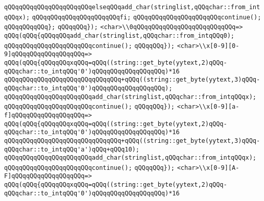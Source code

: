 \verb|qQQqqQQqqQQqqQQqqQQqqQQqelseqQQqadd_char(stringlist,qQQqchar::from_intqQQqx);|\newline
\verb|qQQqqQQqqQQqqQQqqQQqqQQqfi;|\newline
\verb|qQQqqQQqqQQqqQQqqQQqqQQqcontinue();|\newline
\verb|qQQqqQQqqQQq};|\newline
\verb|qQQqqQQq});|\newline
\newline
\verb|<char>\\0qQQqqQQqqQQqqQQqqQQqqQQqqQQq=>|\newline
\verb|qQQq(qQQq{qQQqqQQqadd_char(stringlist,qQQqchar::from_intqQQq0);|\newline
\verb|qQQqqQQqqQQqqQQqqQQqqQQqcontinue();|\newline
\verb|qQQqqQQq});|\newline
\newline
\verb|<char>\\x[0-9][0-9]qQQqqQQqqQQqqQQqqQQq=>|\newline
\verb|qQQq(qQQq{qQQqqQQqxqQQq=qQQq((string::get_byte(yytext,2)qQQq-qQQqchar::to_intqQQq'0')qQQqqQQqqQQqqQQqqQQq)*16|\newline
\verb|qQQqqQQqqQQqqQQqqQQqqQQqqQQqqQQq+qQQq((string::get_byte(yytext,3)qQQq-qQQqchar::to_intqQQq'0')qQQqqQQqqQQqqQQqqQQq);|\newline
\verb|qQQqqQQqqQQqqQQqqQQqqQQqadd_char(stringlist,qQQqchar::from_intqQQqx);|\newline
\verb|qQQqqQQqqQQqqQQqqQQqqQQqcontinue();|\newline
\verb|qQQqqQQq});|\newline
\verb|<char>\\x[0-9][a-f]qQQqqQQqqQQqqQQqqQQq=>|\newline
\verb|qQQq(qQQq{qQQqqQQqxqQQq=qQQq((string::get_byte(yytext,2)qQQq-qQQqchar::to_intqQQq'0')qQQqqQQqqQQqqQQqqQQq)*16|\newline
\verb|qQQqqQQqqQQqqQQqqQQqqQQqqQQqqQQq+qQQq((string::get_byte(yytext,3)qQQq-qQQqchar::to_intqQQq'a')qQQq+qQQq10);|\newline
\verb|qQQqqQQqqQQqqQQqqQQqqQQqadd_char(stringlist,qQQqchar::from_intqQQqx);|\newline
\verb|qQQqqQQqqQQqqQQqqQQqqQQqcontinue();|\newline
\verb|qQQqqQQq});|\newline
\verb|<char>\\x[0-9][A-F]qQQqqQQqqQQqqQQqqQQq=>|\newline
\verb|qQQq(qQQq{qQQqqQQqxqQQq=qQQq((string::get_byte(yytext,2)qQQq-qQQqchar::to_intqQQq'0')qQQqqQQqqQQqqQQqqQQq)*16|\newline
